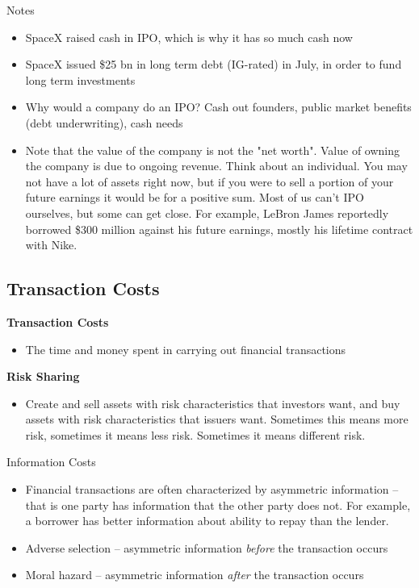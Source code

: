 \documentclass[11pt]{article}
\theoremstyle{definition}
\begin{document}
Notes
\begin{itemize}
    \item SpaceX raised cash in IPO, which is why it has so much cash now
    \item SpaceX issued \$25 bn in long term debt (IG-rated) in July, in order to fund long term investments
    \item Why would a company do an IPO?   Cash out founders, public market benefits (debt underwriting), cash needs
    \item Note that the value of the company is not the "net worth".   Value of owning the company is due to ongoing revenue.  Think about an individual.   You may not have a lot of assets right now, but if you were to sell a portion of your future earnings it would be for a positive sum.   Most of us can't IPO ourselves, but some can get close.   For example, LeBron James reportedly borrowed \$300 million against his future earnings, mostly his lifetime contract with Nike.
\end{itemize}

\subsection{Transaction Costs}
\textbf{Transaction Costs}
\begin{itemize}
\item The time and money spent in carrying out financial transactions
\end{itemize}
\textbf{Risk Sharing }
\begin{itemize}
\item Create and sell assets with risk characteristics that investors want, and buy assets with risk characteristics that issuers want.   Sometimes this means more risk, sometimes it means less risk.   Sometimes it means different risk.
\end{itemize}
Information Costs
\begin{itemize}
\item Financial transactions are often characterized by asymmetric information -- that is one party has information that the other party does not.   For example, a borrower has better information about ability to repay than the lender.
\item Adverse selection -- asymmetric information \textit{before} the transaction occurs
\item Moral hazard -- asymmetric information \textit{after} the transaction occurs
\end{itemize}
\end{document}
